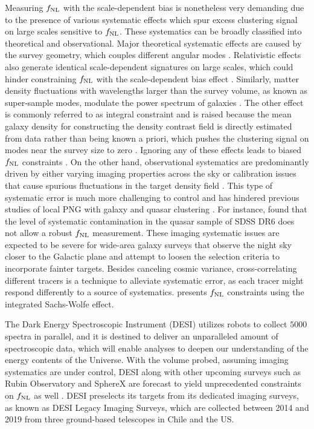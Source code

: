 Measuring $f_{\rm NL}$ with the scale-dependent bias is nonetheless very demanding due to the presence of various systematic effects which spur excess clustering signal on large scales sensitive to $f_{\rm NL}$. These systematics can be broadly classified into theoretical and observational. Major theoretical systematic effects are caused by the survey geometry, which couples different angular modes \citep{beutler2014clustering,wilson2017rapid}. Relativistic effects also generate identical scale-dependent signatures on large scales, which could hinder constraining $f_{\rm NL}$ with the scale-dependent bias effect \citep{wang2020}. Similarly, matter density fluctuations with wavelengths larger than the survey volume, as known as super-sample modes,  modulate the power spectrum of galaxies \citep{castorina2020JCAP}. The other effect is commonly referred to as integral constraint and is raised because the mean galaxy density for constructing the density contrast field is directly estimated from data rather than being known a priori, which pushes the clustering signal on modes near the survey size to zero \citep{peacock1991large,de2019integral}. Ignoring any of these effects leads to biased $f_{\rm NL}$ constraints \citep[see, e.g.,]{riquelme2022primordial}. On the other hand, observational systematics are predominantly driven by either varying imaging properties across the sky \citep{ross2011} or calibration issues that cause spurious fluctuations in the target density field \citep{huterer2013calibration}. This type of systematic error is much more challenging to control and has hindered previous studies of local PNG with galaxy and quasar clustering \citep[see, e.g.,][]{Ho2015JCAP...05..040H}. For instance, \cite{pullen2013systematic} found that the level of systematic contamination in the quasar sample of SDSS DR6 does not allow a robust $f_{\rm NL}$ measurement. These imaging systematic issues are expected to be severe for wide-area galaxy surveys that observe the night sky closer to the Galactic plane and attempt to loosen the selection criteria to incorporate fainter targets. Besides canceling cosmic variance, cross-correlating different tracers is a technique to alleviate systematic error, as each tracer might respond differently to a source of systematics. \cite{giannantonio2014improved} presents $f_{\rm NL}$ constraints using the integrated Sachs-Wolfe effect.

The Dark Energy Spectroscopic Instrument (DESI) utilizes robots to collect $5000$ spectra in parallel, and it is destined to deliver an unparalleled amount of spectroscopic data, which will enable analyses to deepen our understanding of the energy contents of the Universe. With the volume probed, assuming imaging systematics are under control, DESI along with other upcoming surveys such as Rubin Observatory and SphereX are forecast to yield unprecedented constraints on $f_{\rm NL}$ as well \citep[see, e.g.,][]{Heinrich2022AAS...24020203H}. DESI preselects its targets from its dedicated imaging surveys, as known as DESI Legacy Imaging Surveys, which are collected between 2014 and 2019 from three ground-based telescopes in Chile and the US.

